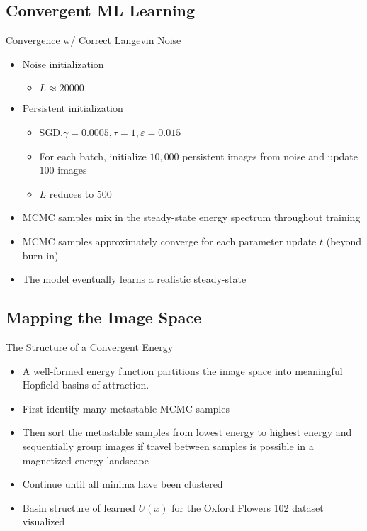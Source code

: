 \documentclass{beamer}
\begin{document}
\subsection{Convergent ML Learning}

\begin{frame}{Convergence w/ Correct Langevin Noise}
\begin{itemize}
\item Noise initialization
\begin{itemize}
\item $L\approx 20000$
\end{itemize}
\item Persistent initialization
\begin{itemize}
\item SGD,$\gamma=0.0005,\tau=1,\varepsilon=0.015$
\item For each batch, initialize $10,000$ persistent images from noise and update $100$ images
\item $L$ reduces to $500$
\end{itemize}
\item MCMC samples mix in the steady-state energy spectrum throughout training
\item MCMC samples approximately converge for each parameter update $t$ (beyond burn-in)
\item The model eventually learns a realistic steady-state
\end{itemize}
\end{frame}

\subsection{Mapping the Image Space}
\begin{frame}{The Structure of a Convergent Energy}
\begin{itemize}
\item A well-formed energy function partitions the image space
into meaningful Hopfield basins of attraction.
\item First identify many
metastable MCMC samples
\item Then sort the metastable
samples from lowest energy to highest energy and sequentially
group images if travel between samples is possible in a
magnetized energy landscape
\item Continue until
all minima have been clustered
\item Basin structure of learned $U(x)$ for the Oxford Flowers 102 dataset visualized
\end{itemize}
\end{frame}
\end{document}
